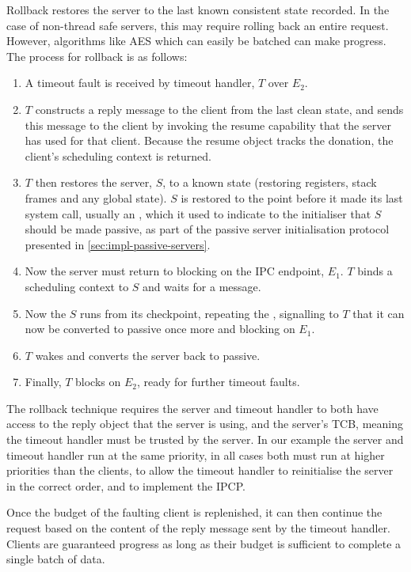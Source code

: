 Rollback restores the server to the last known consistent state recorded. In the case of non-thread
safe servers, this may require rolling back an entire request. However, algorithms like \gls{AES}
which can easily be batched can make progress. The process for rollback is as follows:

\begin{enumerate}\label{e:rollback}
    \item A timeout fault is received by timeout handler, $T$ over $E_{2}$.
    \item $T$ constructs a reply message to the client from the last clean state, and sends this 
        message to the client by invoking the resume capability that the server has used for that client. 
        Because the resume object tracks the donation, the client's scheduling context is returned.
    \item $T$ then restores the server, $S$, to a known state (restoring registers,
        stack frames and any global state). $S$ is restored to the point before it made its
        last system call, usually an \nbsendrecv, which it used to indicate to the initialiser that
        $S$ should be made passive, as part of the passive server initialisation protocol presented
        in \cref{sec:impl-passive-servers}.
    \item Now the server must return to blocking on the IPC endpoint, $E_{1}$. $T$ binds a
        scheduling context to $S$ and waits for a message. 
    \item Now the $S$ runs from its checkpoint, repeating the \nbsendrecv, signalling to $T$ that it
        can now be converted to passive once more and blocking on $E_{1}$. 
    \item $T$ wakes and converts the server back to passive.
    \item Finally, $T$ blocks on $E_{2}$, ready for further timeout faults.
\end{enumerate}

The rollback technique requires the server and timeout handler to both have access to the reply
object that the server is using, and the server's \gls{TCB}, meaning the timeout handler must be
trusted by the server. In our example the server and timeout handler run at the same priority, in
all cases both must run at higher priorities than the clients, to allow the timeout handler to
reinitialise the server in the correct order, and to implement the \gls{IPCP}. 

Once the budget of the faulting client is replenished, it can then continue the request based on the
content of the reply message sent by the timeout handler. Clients are guaranteed progress as long as
their budget is sufficient to complete a single batch of data.

